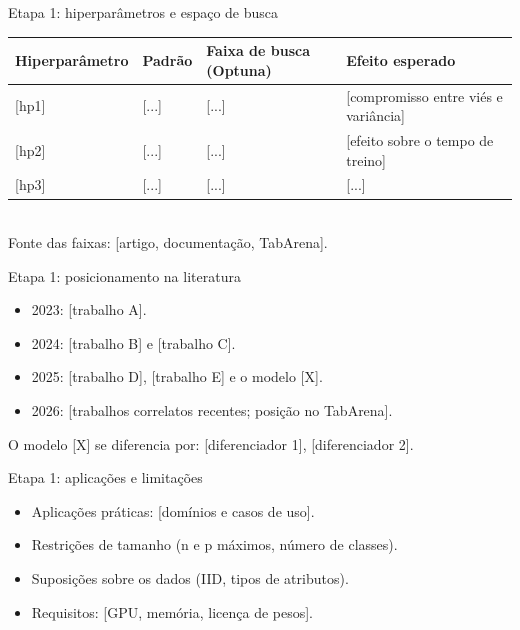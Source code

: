 \documentclass[aspectratio=169,11pt]{beamer}
\begin{document}
\begin{frame}{Etapa 1: hiperparâmetros e espaço de busca}
    \footnotesize
    \begin{tabular}{l p{2.4cm} p{3.6cm} p{4.2cm}}
        \toprule
        \textbf{Hiperparâmetro} & \textbf{Padrão} & \textbf{Faixa de busca (Optuna)} & \textbf{Efeito esperado} \\
        \midrule
        {}[hp1] & [...] & [...] & [compromisso entre viés e variância] \\
        {}[hp2] & [...] & [...] & [efeito sobre o tempo de treino] \\
        {}[hp3] & [...] & [...] & [...] \\
        \bottomrule
    \end{tabular}
    \\[0.4em]
    \footnotesize Fonte das faixas: [artigo, documentação, TabArena].
\end{frame}

\begin{frame}{Etapa 1: posicionamento na literatura}
    \begin{itemize}
        \item 2023: [trabalho A].
        \item 2024: [trabalho B] e [trabalho C].
        \item 2025: [trabalho D], [trabalho E] e o modelo [X].
        \item 2026: [trabalhos correlatos recentes; posição no TabArena].
    \end{itemize}
    \vspace{0.3em}
    \footnotesize O modelo [X] se diferencia por: [diferenciador 1], [diferenciador 2].
\end{frame}

\begin{frame}{Etapa 1: aplicações e limitações}
    \begin{itemize}
        \item Aplicações práticas: [domínios e casos de uso].
        \item Restrições de tamanho (n e p máximos, número de classes).
        \item Suposições sobre os dados (IID, tipos de atributos).
        \item Requisitos: [GPU, memória, licença de pesos].
    \end{itemize}
\end{frame}
\end{document}
